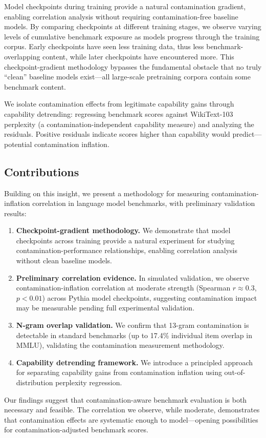Model checkpoints during training provide a natural contamination gradient, enabling correlation analysis without requiring contamination-free baseline models. By comparing checkpoints at different training stages, we observe varying levels of cumulative benchmark exposure as models progress through the training corpus. Early checkpoints have seen less training data, thus less benchmark-overlapping content, while later checkpoints have encountered more. This checkpoint-gradient methodology bypasses the fundamental obstacle that no truly ``clean'' baseline models exist---all large-scale pretraining corpora contain some benchmark content.

We isolate contamination effects from legitimate capability gains through capability detrending: regressing benchmark scores against WikiText-103 perplexity (a contamination-independent capability measure) and analyzing the residuals. Positive residuals indicate scores higher than capability would predict---potential contamination inflation.

\subsection{Contributions}

Building on this insight, we present a methodology for measuring contamination-inflation correlation in language model benchmarks, with preliminary validation results:

\begin{enumerate}
    \item \textbf{Checkpoint-gradient methodology.} We demonstrate that model checkpoints across training provide a natural experiment for studying contamination-performance relationships, enabling correlation analysis without clean baseline models.

    \item \textbf{Preliminary correlation evidence.} In simulated validation, we observe contamination-inflation correlation at moderate strength (Spearman $r \approx 0.3$, $p < 0.01$) across Pythia model checkpoints, suggesting contamination impact may be measurable pending full experimental validation.

    \item \textbf{N-gram overlap validation.} We confirm that 13-gram contamination is detectable in standard benchmarks (up to 17.4\% individual item overlap in MMLU), validating the contamination measurement methodology.

    \item \textbf{Capability detrending framework.} We introduce a principled approach for separating capability gains from contamination inflation using out-of-distribution perplexity regression.
\end{enumerate}

Our findings suggest that contamination-aware benchmark evaluation is both necessary and feasible. The correlation we observe, while moderate, demonstrates that contamination effects are systematic enough to model---opening possibilities for contamination-adjusted benchmark scores.
